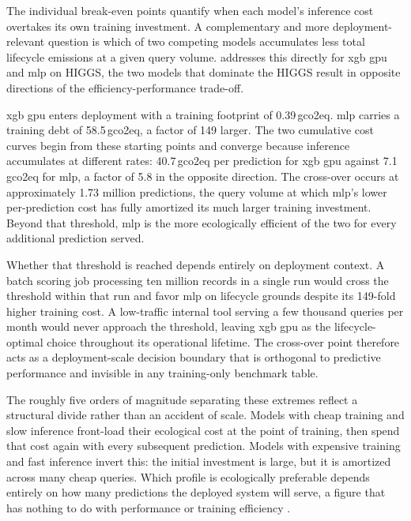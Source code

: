 The individual break-even points quantify when each model's inference cost overtakes its own training investment. A complementary and more deployment-relevant question is which of two competing models accumulates less total lifecycle emissions at a given query volume.  addresses this directly for \gls{xgb} \gls{gpu} and \gls{mlp} on HIGGS, the two models that dominate the HIGGS result in opposite directions of the efficiency-performance trade-off.

\gls{xgb} \gls{gpu} enters deployment with a training footprint of 0.39\,\gls{gco2eq}. \gls{mlp} carries a training debt of 58.5\,\gls{gco2eq}, a factor of 149 larger. The two cumulative cost curves begin from these starting points and converge because inference accumulates at different rates: 40.7\,\textmu\gls{gco2eq} per prediction for \gls{xgb} \gls{gpu} against 7.1\,\textmu\gls{gco2eq} for \gls{mlp}, a factor of 5.8 in the opposite direction. The cross-over occurs at approximately 1.73 million predictions, the query volume at which \gls{mlp}'s lower per-prediction cost has fully amortized its much larger training investment. Beyond that threshold, \gls{mlp} is the more ecologically efficient of the two for every additional prediction served.

Whether that threshold is reached depends entirely on deployment context. A batch scoring job processing ten million records in a single run would cross the threshold within that run and favor \gls{mlp} on lifecycle grounds despite its 149-fold higher training cost. A low-traffic internal tool serving a few thousand queries per month would never approach the threshold, leaving \gls{xgb} \gls{gpu} as the lifecycle-optimal choice throughout its operational lifetime. The cross-over point therefore acts as a deployment-scale decision boundary that is orthogonal to predictive performance and invisible in any training-only benchmark table.

The roughly five orders of magnitude separating these extremes reflect a structural divide rather than an accident of scale. Models with cheap training and slow inference front-load their ecological cost at the point of training, then spend that cost again with every subsequent prediction. Models with expensive training and fast inference invert this: the initial investment is large, but it is amortized across many cheap queries. Which profile is ecologically preferable depends entirely on how many predictions the deployed system will serve, a figure that has nothing to do with performance or training efficiency \parencite{luccioniPowerHungryProcessing2024}.

